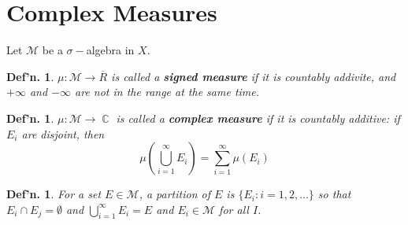 \documentclass[12pt, a4paper]{book}
\DeclareMathOperator{\C}{\mathbb{C}}
\newtheorem{definition}[theorem]{Def'n.}
\theoremstyle{nonumberplain}
\begin{document}
\section{Complex Measures}
Let $\mathcal{M}$ be a $\sigma-$algebra in $X$.
\begin{definition}
    $\mu:\mathcal{M}\to\overline{R}$ is called a \textbf{signed measure} if it is countably addivite, and $+\infty$ and $-\infty$ are not in the range at the same time.
\end{definition}
\begin{definition}
    $\mu:\mathcal{M}\to\C$ is called a \textbf{complex measure} if it is countably additive: if $E_i$ are disjoint, then
    \[\mu\left(\bigcup\limits_{i=1}^\infty E_i\right)=\sum\limits_{i=1}^\infty \mu(E_i)\]
\end{definition}
\begin{definition}
    For a set $E\in\mathcal{M}$, a partition of $E$ is $\{E_i:i=1,2,\ldots\}$ so that $E_i\cap E_j=\emptyset$ and $\bigcup\limits_{i=1}^\infty E_i=E$ and $E_i\in\mathcal{M}$ for all $I$.
\end{definition}
\end{document}
